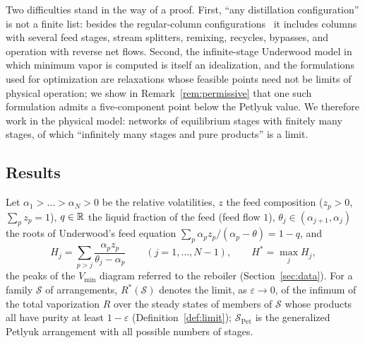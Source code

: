 \documentclass[11pt,a4paper]{report}
\newcommand{\cS}{\mathcal S}
\newcommand{\Hs}{H^{*}}
\newcommand{\Spet}{\cS_{\mathrm{Pet}}}
\begin{document}
Two difficulties stand in the way of a proof. First, ``any distillation configuration'' is not a finite list:
besides the regular-column configurations~\autocite{Agrawal2003,SA10} it includes columns with several feed stages,
stream splitters, remixing, recycles, bypasses, and operation with reverse net flows. Second, the infinite-stage
Underwood model in which minimum vapor is computed is itself an idealization, and the formulations used for
optimization are relaxations whose feasible points need not be limits of physical operation; we show in
Remark~\ref{rem:permissive} that one such formulation admits a five-component point below the Petlyuk value.
We therefore work in the physical model: networks of equilibrium stages with finitely many stages, of which
``infinitely many stages and pure products'' is a limit.

\subsection{Results}

Let \(\alpha_1>\dots>\alpha_N>0\) be the relative volatilities, \(z\) the feed composition (\(z_p>0\),
\(\sum_pz_p=1\)), \(q\in\mathbb{R}\) the liquid fraction of the feed (feed flow \(1\)), \(\theta_j\in(\alpha_{j+1},\alpha_j)\) the
roots of Underwood's feed equation \(\sum_p\alpha_pz_p/(\alpha_p-\theta)=1-q\), and
\[H_j=\sum_{p>j}\frac{\alpha_pz_p}{\theta_j-\alpha_p}\qquad(j=1,\dots,N-1),\qquad \Hs=\max_jH_j ,\]
the peaks of the \(V_{\min}\) diagram referred to the reboiler (Section~\ref{sec:data}). For a family \(\cS\) of
arrangements, \(R^*(\cS)\) denotes the limit, as \(\varepsilon\to0\), of the infimum of the total vaporization \(R\) over
the steady states of members of \(\cS\) whose products all have purity at least \(1-\varepsilon\)
(Definition~\ref{def:limit}); \(\Spet\) is the generalized Petlyuk arrangement with all possible numbers of stages.
\end{document}
